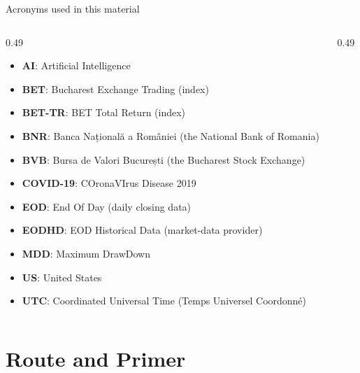 {
\begin{frame}[noframenumbering]
    \titlepage
\end{frame}
}
\begin{frame}{Acronyms used in this material}
\begin{columns}[T]
\begin{column}{0.49\textwidth}
\begin{itemize}\setlength{\itemsep}{0pt}
    \item \textbf{AI}: Artificial Intelligence
    \item \textbf{BET}: Bucharest Exchange Trading (index)
    \item \textbf{BET-TR}: BET Total Return (index)
    \item \textbf{BNR}: Banca Națională a României (the National Bank of Romania)
    \item \textbf{BVB}: Bursa de Valori București (the Bucharest Stock Exchange)
    \item \textbf{COVID-19}: COronaVIrus Disease 2019
    \item \textbf{EOD}: End Of Day (daily closing data)
    \item \textbf{EODHD}: EOD Historical Data (market-data provider)
    \item \textbf{MDD}: Maximum DrawDown
    \item \textbf{US}: United States
    \item \textbf{UTC}: Coordinated Universal Time (Temps Universel Coordonné)
\end{itemize}
\end{column}
\begin{column}{0.49\textwidth}
\end{column}
\end{columns}
\end{frame}

\section{Route and Primer}

